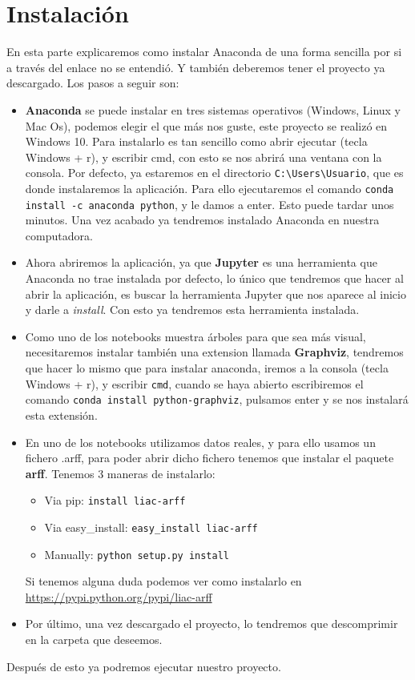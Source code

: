 \section{Instalación}
En esta parte explicaremos como instalar Anaconda de una forma sencilla por si a través del enlace no se entendió. Y también deberemos tener el proyecto ya descargado. Los pasos a seguir son:
\begin{itemize}
	\item \textbf{Anaconda} se puede instalar en tres sistemas operativos (Windows, Linux y Mac Os), podemos elegir el que más nos guste, este proyecto se realizó en Windows 10. Para instalarlo es tan sencillo como abrir ejecutar (tecla Windows + r), y escribir cmd, con esto se nos abrirá una ventana con la consola. Por defecto, ya estaremos en el directorio \texttt{C:\textbackslash Users\textbackslash Usuario}, que es donde instalaremos la aplicación. Para ello ejecutaremos el comando \texttt{conda install -c anaconda python}, y le damos a enter. Esto puede tardar unos minutos. Una vez acabado ya tendremos instalado Anaconda en nuestra computadora.
	\item Ahora abriremos la aplicación, ya que \textbf{Jupyter} es una herramienta que Anaconda no trae instalada por defecto, lo único que tendremos que hacer al abrir la aplicación, es buscar la herramienta Jupyter que nos aparece al inicio y darle a \textit{install}. Con esto ya tendremos esta herramienta instalada.
	\item Como uno de los notebooks muestra árboles para que sea más visual, necesitaremos instalar también una extension llamada \textbf{Graphviz}, tendremos que hacer lo mismo que para instalar anaconda, iremos a la consola (tecla Windows + r), y escribir \texttt{cmd}, cuando se haya abierto escribiremos el comando \texttt{conda install python-graphviz}, pulsamos enter y se nos instalará esta extensión.
	\item En uno de los notebooks utilizamos datos reales, y para ello usamos un fichero .arff, para poder abrir dicho fichero tenemos que instalar el paquete \textbf{arff}. Tenemos 3 maneras de instalarlo:
	\begin{itemize}
		\item Via pip: \texttt{install liac-arff}
		\item Via easy\_install: \texttt{easy\_install liac-arff}
		\item Manually: \texttt{python setup.py install}
	\end{itemize}
	Si tenemos alguna duda podemos ver como instalarlo en \url{https://pypi.python.org/pypi/liac-arff}
	\item Por último, una vez descargado el proyecto, lo tendremos que descomprimir en la carpeta que deseemos.
\end{itemize}
Después de esto ya podremos ejecutar nuestro proyecto.

